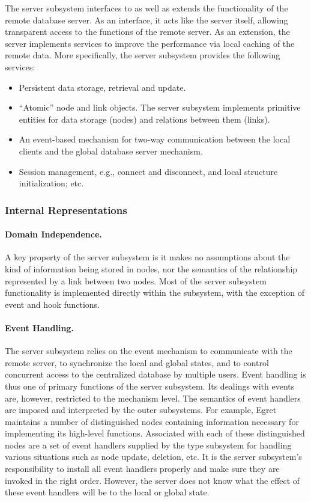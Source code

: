 The server subsystem interfaces to as well as extends the functionality of
the remote database server. As an interface, it acts like the server
itself, allowing transparent access to the functions of the remote server.
As an extension, the server implements services to improve the performance
via local caching of the remote data. More specifically, the server
subsystem provides the following services:

\begin{itemize}
\item  Persistent data storage, retrieval and update. 
  
\item ``Atomic'' node and link objects. The server subsystem implements
  primitive entities for data storage (nodes) and relations between them
  (links).
  
\item An event-based mechanism for two-way communication 
  between the local clients and the global database server mechanism.
  
\item Session management, e.g., connect and disconnect, and local
  structure initialization; etc.
\end{itemize}


\subsubsection{Internal Representations}

\paragraph {Domain Independence.}
A key property of the server subsystem is it makes no assumptions
about the kind of information being stored in nodes, nor the semantics
of the relationship represented by a link between two nodes.
Most of the server subsystem functionality is implemented directly within
the subsystem, with the exception of event and hook functions.

\paragraph{Event Handling.}
The server subsystem relies on the event mechanism to communicate with the
remote server, to synchronize the local and global states, and to control
concurrent access to the centralized database by multiple users. Event
handling is thus one of primary functions of the server subsystem. Its
dealings with events are, however, restricted to the mechanism level. The
semantics of event handlers are imposed and interpreted by the outer
subsystems. For example, Egret maintains a number of distinguished nodes
containing information necessary for implementing its high-level functions.
Associated with each of these distinguished nodes are a set of event
handlers supplied by the type subsystem for handling various situations
such as node update, deletion, etc. It is the server subsystem's
responsibility to install all event handlers properly and make sure they
are invoked in the right order. However, the server does not know what the
effect of these event handlers will be to the local or global state.


